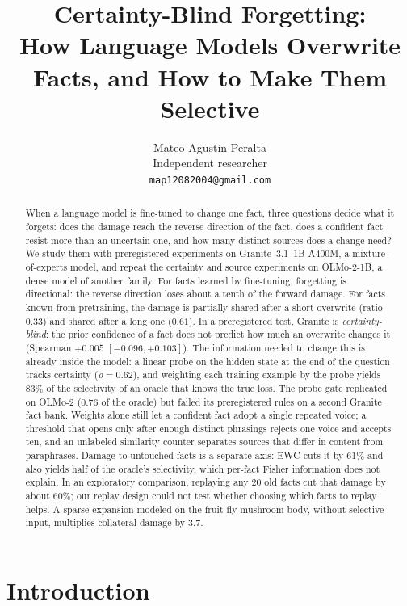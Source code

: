 \documentclass[11pt]{article}
\title{Certainty-Blind Forgetting:\\How Language Models Overwrite Facts, and How to Make Them Selective}
\author{Mateo Agustin Peralta\\ {Independent researcher}\\ \texttt{map12082004@gmail.com}}
\date{}
\begin{document}
\maketitle

\begin{abstract}
When a language model is fine-tuned to change one fact, three questions decide what it forgets: does the damage reach the reverse direction of the fact, does a confident fact resist more than an uncertain one, and how many distinct sources does a change need?
We study them with preregistered experiments on Granite~3.1~1B-A400M, a mixture-of-experts model, and repeat the certainty and source experiments on OLMo-2-1B, a dense model of another family.
For facts learned by fine-tuning, forgetting is directional: the reverse direction loses about a tenth of the forward damage.
For facts known from pretraining, the damage is partially shared after a short overwrite (ratio $0.33$) and shared after a long one ($0.61$).
In a preregistered test, Granite is \emph{certainty-blind}: the prior confidence of a fact does not predict how much an overwrite changes it (Spearman $+0.005$ $[-0.096, +0.103]$).
The information needed to change this is already inside the model: a linear probe on the hidden state at the end of the question tracks certainty ($\rho = 0.62$), and weighting each training example by the probe yields 83\% of the selectivity of an oracle that knows the true loss.
The probe gate replicated on OLMo-2 (0.76 of the oracle) but failed its preregistered rules on a second Granite fact bank.
Weights alone still let a confident fact adopt a single repeated voice; a threshold that opens only after enough distinct phrasings rejects one voice and accepts ten, and an unlabeled similarity counter separates sources that differ in content from paraphrases.
Damage to untouched facts is a separate axis: EWC cuts it by 61\% and also yields half of the oracle's selectivity, which per-fact Fisher information does not explain.
In an exploratory comparison, replaying any 20 old facts cut that damage by about 60\%; our replay design could not test whether choosing which facts to replay helps.
A sparse expansion modeled on the fruit-fly mushroom body, without selective input, multiplies collateral damage by 3.7.
\end{abstract}

\section{Introduction}
\end{document}
